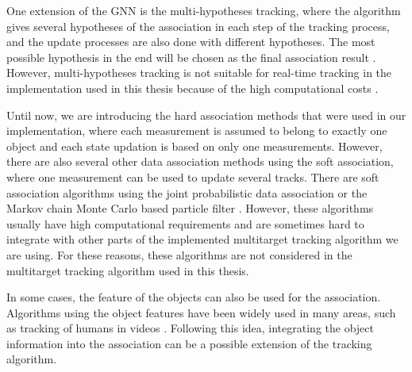 One extension of the GNN is the multi-hypotheses tracking, where the algorithm gives several hypotheses of the association in each step of the tracking process, and the update processes are also done with different hypotheses. The most possible hypothesis in the end will be chosen as the final association result \cite{blackman2004multiple}. However, multi-hypotheses tracking is not suitable for real-time tracking in the implementation used in this thesis because of the high computational costs \cite{pfaff2019multitarget}. 

Until now, we are introducing the hard association methods that were used in our implementation, where each measurement is assumed to belong to exactly one object and each state updation is based on only one measurements. However, there are also several other data association methods using the soft association, where one measurement can be used to update several tracks. There are soft association algorithms using the joint probabilistic data association \cite{fortmann1983sonar} or the Markov chain Monte Carlo based particle filter \cite{khan2005mcmc}. However, these algorithms usually have high computational requirements and are sometimes hard to integrate with other parts of the implemented multitarget tracking algorithm we are using. For these reasons, these algorithms are not considered in the multitarget tracking algorithm used in this thesis.

In some cases, the feature of the objects can also be used for the association. Algorithms using the object features have been widely used in many areas, such as tracking of humans in videos \cite{wu2006tracking}. Following this idea, integrating the object information into the association can be a possible extension of the tracking algorithm.




